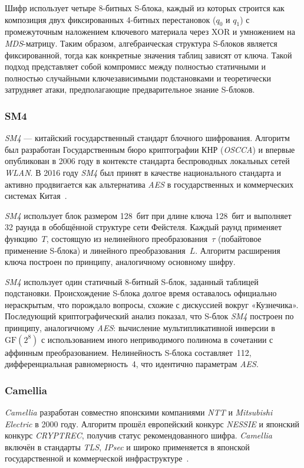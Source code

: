 Шифр использует четыре 8-битных S-блока, каждый из которых строится как
композиция двух фиксированных 4-битных перестановок ($q_0$ и $q_1$)
с промежуточным наложением ключевого материала через XOR и умножением на
\textit{MDS}-матрицу. Таким образом, алгебраическая структура S-блоков является
фиксированной, тогда как конкретные значения таблиц зависят от ключа.
Такой подход представляет собой компромисс между полностью статичными
и полностью случайными ключезависимыми подстановками и теоретически затрудняет
атаки, предполагающие предварительное знание S-блоков.

\subsubsection{SM4}

\textit{SM4} — китайский государственный стандарт блочного шифрования. Алгоритм
был разработан Государственным бюро криптографии КНР (\textit{OSCCA}) и впервые
опубликован в 2006 году в контексте стандарта беспроводных локальных
сетей \textit{WLAN}. В 2016 году \textit{SM4} был принят в качестве национального
стандарта и активно продвигается как альтернатива \textit{AES}
в государственных и коммерческих системах Китая~\cite{sm4_2006}.

\textit{SM4} использует блок размером 128~бит при длине ключа 128~бит и выполняет
32 раунда в обобщённой структуре сети Фейстеля. Каждый раунд применяет
функцию~$T$, состоящую из нелинейного преобразования~$\tau$ (побайтовое
применение S-блока) и линейного преобразования~$L$. Алгоритм расширения
ключа построен по принципу, аналогичному основному шифру.


\textit{SM4} использует один статичный 8-битный S-блок, заданный таблицей подстановки.
Происхождение S-блока долгое время оставалось официально нераскрытым,
что порождало вопросы, схожие с дискуссией вокруг «Кузнечика». Последующий
криптографический анализ показал, что S-блок \textit{SM4} построен по принципу,
аналогичному \textit{AES}: вычисление мультипликативной инверсии в $\mathrm{GF}(2^8)$
с использованием иного неприводимого полинома в сочетании с аффинным
преобразованием. Нелинейность S-блока составляет~112, дифференциальная
равномерность~4, что идентично параметрам \textit{AES}.


\subsubsection{Camellia}

\textit{Camellia }разработан совместно японскими компаниями \textit{NTT} и \textit{Mitsubishi Electric}
в 2000 году. Алгоритм прошёл европейский конкурс \textit{NESSIE}
и японский конкурс \textit{CRYPTREC}, получив статус рекомендованного шифра.
\textit{Camellia} включён в стандарты \textit{TLS}, \textit{IPsec} и широко применяется
в японской государственной и коммерческой инфраструктуре~\cite{camellia2001}.

